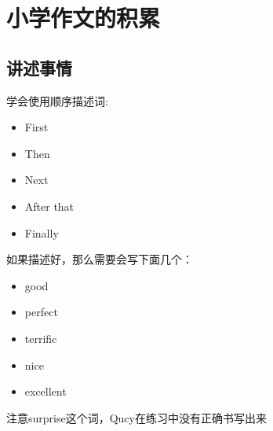 \section{小学作文的积累}

  \subsection{讲述事情}
学会使用顺序描述词:

\begin{itemize}
    \item First
    \item Then
    \item Next
    \item After that
    \item Finally
\end{itemize}

如果描述好，那么需要会写下面几个：

\begin{itemize}
    \item good
    \item perfect
    \item terrific
    \item nice
    \item excellent
\end{itemize}

注意surprise这个词，Qucy在练习中没有正确书写出来
